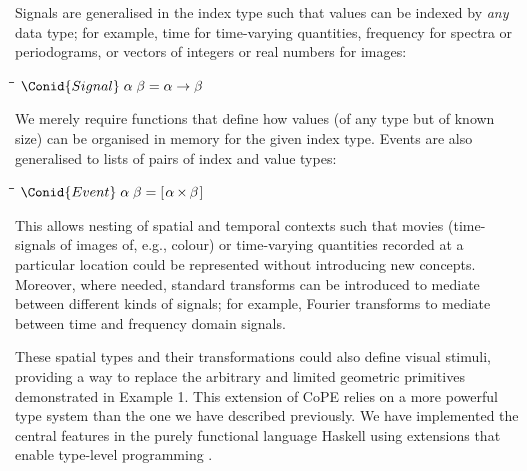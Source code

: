 Signals are generalised in the index type such that values can
be indexed by \emph{any} data type; for example, time for time-varying
quantities, frequency for spectra or periodograms, or vectors of
integers or real numbers for images:
\begin{tabbing}
\qquad\=\hspace{\lwidth}\=\hspace{\cwidth}\=\+\kill
$\Conid{Signal}\;\alpha\;\beta\mathrel{=}\alpha \to \beta$
\end{tabbing}
We merely require functions that define how values (of any type but of
known size) can be organised in memory for the given index type.
%
Events are also generalised to lists of pairs of index and value types: 
\begin{tabbing}
\qquad\=\hspace{\lwidth}\=\hspace{\cwidth}\=\+\kill
${\Conid{Event}\;\alpha\;\beta\mathrel{=}[\mskip1.5mu \alpha\;\!\!\times\!\!\;\beta\mskip1.5mu]}$
\end{tabbing}
This allows nesting of spatial and temporal contexts such that movies
(time-signals of images of, e.g., colour) or time-varying quantities
recorded at a particular location \citep[e.g., spot calcium
measurements as space-events of time-signals of
concentration;][]{DiGregorio1999} could be represented without
introducing new concepts. Moreover, where needed, standard transforms
can be introduced to mediate between different kinds of signals; for example,
Fourier transforms to mediate between time and frequency domain signals.

These spatial types and their transformations could also define visual
stimuli, providing a way to replace the arbitrary and limited
geometric primitives demonstrated in Example 1. This extension of CoPE
relies on a more powerful type system than the one we have described
previously. We have implemented the central features in the purely
functional language Haskell using extensions that enable type-level
programming \citep{Kiselyov2010}.

